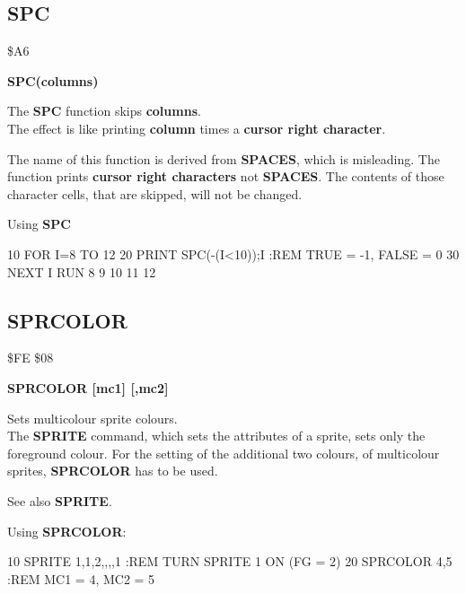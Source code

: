 \subsection{SPC}
\begin{description}[leftmargin=3cm,style=nextline]
\item [Token:] \$A6
\item [Format:] {\bf SPC(columns)}
\item [Usage:] The {\bf SPC} function skips {\bf columns}. \\
               The effect is like printing {\bf column}
               times a {\bf cursor right character}.

\item [Remarks:] The name of this function is derived from
                 {\bf SPACES}, which is misleading.
                 The function prints {\bf cursor right characters}
                 not {\bf SPACES}. The contents of those character
                 cells, that are skipped, will not be changed.

\item [Example:] Using {\bf SPC}
\begin{screenoutput}
10 FOR I=8 TO 12
20 PRINT SPC(-(I<10));I :REM TRUE = -1, FALSE = 0
30 NEXT I
RUN
 8
 9
10
11
12
\end{screenoutput}
\end{description}


\newpage
\subsection{SPRCOLOR}
\begin{description}[leftmargin=3cm,style=nextline]
\item [Token:] \$FE \$08
\item [Format:] {\bf SPRCOLOR [mc1] [,mc2]} \\
\item [Usage:]  Sets multicolour sprite colours. \\
                The {\bf SPRITE} command, which sets the
                attributes of a sprite, sets only the foreground
                colour. For the setting of the  additional two colours,
                of multicolour sprites, {\bf SPRCOLOR} has
                to be used.

\item [Remarks:] See also {\bf SPRITE}.

\item [Example:] Using {\bf SPRCOLOR}:
\begin{screenoutput}
 10 SPRITE 1,1,2,,,,1  :REM TURN SPRITE 1 ON (FG = 2)
 20 SPRCOLOR 4,5       :REM MC1 = 4, MC2 = 5
\end{screenoutput}
\end{description}

